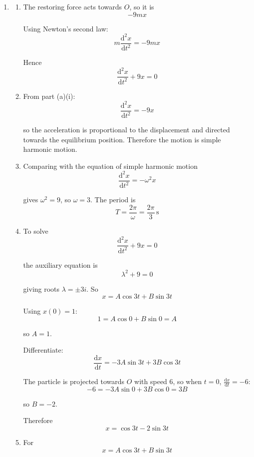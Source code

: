 \documentclass[leqno]{article}
\begin{document}
\begin{enumerate}[
  label=\textbf{\arabic*.},
  leftmargin=*,
  topsep=0pt,
  partopsep=0pt,
  parsep=0pt
]
\vspace*{10pt}

\begin{djsSolution}
\begin{enumerate}[label=\textbf{(\alph*)}]
  \item
  \begin{enumerate}[label=(\roman*)]
    \item The restoring force acts towards \(O\), so it is
    \[
    -9mx
    \]

    Using Newton's second law:
    \[
    m\frac{\mathrm{d}^2x}{\mathrm{d}t^2}=-9mx
    \]

    Hence
    \[
    \frac{\mathrm{d}^2x}{\mathrm{d}t^2}+9x=0
    \]

    \item From part (a)(i):
    \[
    \frac{\mathrm{d}^2x}{\mathrm{d}t^2}=-9x
    \]

    so the acceleration is proportional to the displacement and directed towards the equilibrium position. Therefore the motion is simple harmonic motion.

    \item Comparing with the equation of simple harmonic motion
    \[
    \frac{\mathrm{d}^2x}{\mathrm{d}t^2}=-\omega^2x
    \]

    gives \(\omega^2=9\), so \(\omega=3\). The period is
    \[
    T=\frac{2\pi}{\omega}=\frac{2\pi}{3}\,\mathrm{s}
    \]

    \item To solve
    \[
    \frac{\mathrm{d}^2x}{\mathrm{d}t^2}+9x=0
    \]

    the auxiliary equation is
    \[
    \lambda^2+9=0
    \]

    giving roots \(\lambda=\pm 3i\). So
    \[
    x=A\cos 3t+B\sin 3t
    \]

    Using \(x(0)=1\):
    \[
    1=A\cos 0+B\sin 0=A
    \]

    so \(A=1\).

    Differentiate:
    \[
    \frac{\mathrm{d}x}{\mathrm{d}t}=-3A\sin 3t+3B\cos 3t
    \]

    The particle is projected towards \(O\) with speed \(6\), so when \(t=0\), \(\frac{\mathrm{d}x}{\mathrm{d}t}=-6\):
    \[
    -6=-3A\sin 0+3B\cos 0=3B
    \]

    so \(B=-2\).

    Therefore
    \[
    x=\cos 3t-2\sin 3t
    \]

    \item For
    \[
    x=A\cos 3t+B\sin 3t
    \]


\end{enumerate}
\end{enumerate}
\end{djsSolution}
\end{enumerate}
\end{document}
